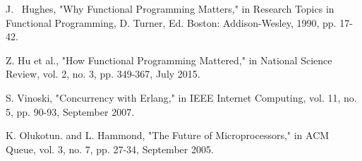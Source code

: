 \documentclass[conference]{IEEEtran}
\begin{document}
\begin{thebibliography}{1}




J. ~Hughes, "Why Functional Programming Matters," in Research Topics in Functional Programming, D. Turner, Ed. Boston: Addison-Wesley, 1990, pp. 17-42.

Z. Hu et al., "How Functional Programming Mattered," in National Science Review, vol. 2, no. 3, pp. 349-367, July 2015.

S. Vinoski, "Concurrency with Erlang," in IEEE Internet Computing, vol. 11, no. 5, pp. 90-93, September 2007.

K. Olukotun. and L. Hammond, "The Future of Microprocessors," in ACM Queue, vol. 3, no. 7, pp. 27-34, September 2005.

\end{thebibliography}






\end{document}

